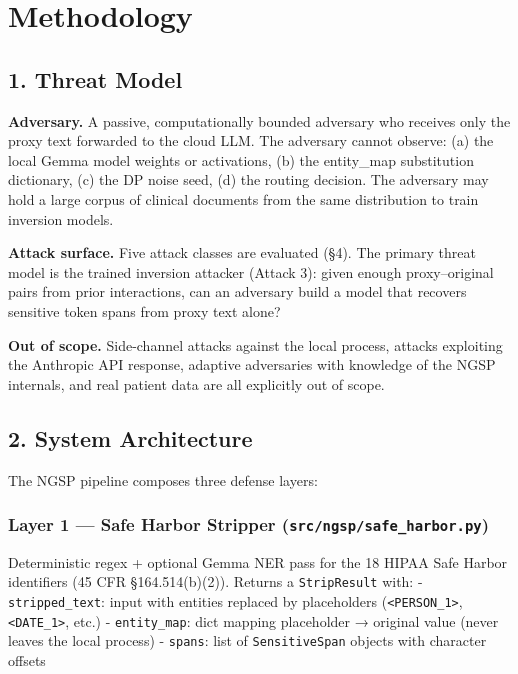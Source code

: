 \section{Methodology}\label{methodology}

\subsection{1. Threat Model}\label{threat-model}

\textbf{Adversary.} A passive, computationally bounded adversary who
receives only the proxy text forwarded to the cloud LLM. The adversary
cannot observe: (a) the local Gemma model weights or activations, (b)
the entity\_map substitution dictionary, (c) the DP noise seed, (d) the
routing decision. The adversary may hold a large corpus of clinical
documents from the same distribution to train inversion models.

\textbf{Attack surface.} Five attack classes are evaluated (§4). The
primary threat model is the trained inversion attacker (Attack 3): given
enough proxy--original pairs from prior interactions, can an adversary
build a model that recovers sensitive token spans from proxy text alone?

\textbf{Out of scope.} Side-channel attacks against the local process,
attacks exploiting the Anthropic API response, adaptive adversaries with
knowledge of the NGSP internals, and real patient data are all
explicitly out of scope.

\subsection{2. System Architecture}\label{system-architecture}

The NGSP pipeline composes three defense layers:

\subsubsection{\texorpdfstring{Layer 1 --- Safe Harbor Stripper
(\texttt{src/ngsp/safe\_harbor.py})}{Layer 1 --- Safe Harbor Stripper (src/ngsp/safe\_harbor.py)}}\label{layer-1-safe-harbor-stripper-srcngspsafe_harbor.py}

Deterministic regex + optional Gemma NER pass for the 18 HIPAA Safe
Harbor identifiers (45 CFR §164.514(b)(2)). Returns a
\texttt{StripResult} with: - \texttt{stripped\_text}: input with
entities replaced by placeholders
(\texttt{\textless{}PERSON\_1\textgreater{}},
\texttt{\textless{}DATE\_1\textgreater{}}, etc.) - \texttt{entity\_map}:
dict mapping placeholder → original value (never leaves the local
process) - \texttt{spans}: list of \texttt{SensitiveSpan} objects with
character offsets

